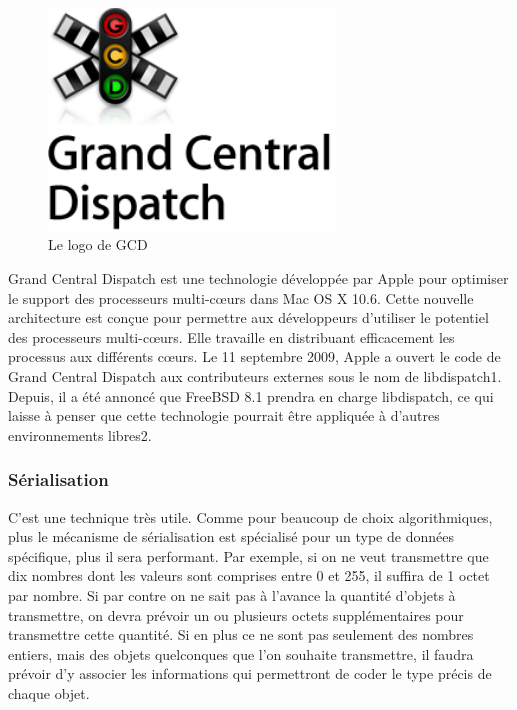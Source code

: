 
\begin{figure}[htbp]
	\centering
		\includegraphics[width=3in]{Image/icone-gcd.jpg}
	\caption{Le logo de GCD}
	\label{fig:Image_icone_gcd}
\end{figure}


Grand Central Dispatch est une technologie développée par Apple pour optimiser le support des processeurs multi-cœurs dans Mac OS X 10.6.
Cette nouvelle architecture est conçue pour permettre aux développeurs d'utiliser le potentiel des processeurs multi-cœurs. Elle travaille en distribuant efficacement les processus aux différents cœurs.
Le 11 septembre 2009, Apple a ouvert le code de Grand Central Dispatch aux contributeurs externes sous le nom de libdispatch1. Depuis, il a été annoncé que FreeBSD 8.1 prendra en charge libdispatch, ce qui laisse à penser que cette technologie pourrait être appliquée à d'autres environnements libres2.



\subsubsection{Sérialisation} %
\label{ssub:sérialisation}

C'est une technique très utile. Comme pour beaucoup de choix algorithmiques, plus le mécanisme de sérialisation est spécialisé pour un type de données spécifique, plus il sera performant. Par exemple, si on ne veut transmettre que dix nombres dont les valeurs sont comprises entre 0 et 255, il suffira de 1 octet par nombre. Si par contre on ne sait pas à l'avance la quantité d'objets à transmettre, on devra prévoir un ou plusieurs octets supplémentaires pour transmettre cette quantité. Si en plus ce ne sont pas seulement des nombres entiers, mais des objets quelconques que l'on souhaite transmettre, il faudra prévoir d'y associer les informations qui permettront de coder le type précis de chaque objet.

